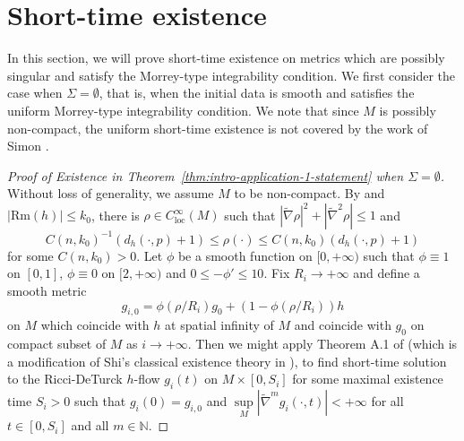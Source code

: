 \documentclass[12pt]{amsart}
\theoremstyle{plain}
\theoremstyle{plain}
\theoremstyle{definition}
\theoremstyle{remark}
\numberwithin{equation}{subsection}
\newcommand{\hdel}{\tilde{\nabla}}
\begin{document}
\section{Short-time existence}\label{sec:proof-of-main-theorem}
In this section, we will prove short-time existence on metrics which are possibly singular and satisfy the Morrey-type integrability condition. We first consider the case when $\Sigma=\emptyset$, that is, when the initial data is smooth and satisfies the uniform Morrey-type integrability condition. We note that since $M$ is possibly non-compact, the uniform short-time existence is not covered by the work of Simon \cite{simon_deformation_2002}.
\begin{proof}[Proof of Existence in Theorem~\ref{thm:intro-application-1-statement} when $\Sigma=\emptyset$]

Without loss of generality, we assume $M$ to be non-compact. By \cite{tam_exhaustion_2010} and $|\text{Rm}(h)|\leq k_0$, there is $\rho \in C^\infty_\text{loc}(M)$ such that $|\hdel \rho|^2 + |\hdel^2 \rho| \leq 1$ and
    \begin{equation*}
        C(n,k_0)^{-1}(d_h(\cdot, p)+1)\leq \rho(\cdot) \leq  C(n,k_0)(d_h(\cdot,p) + 1)
    \end{equation*}
    for some $ C(n,k_0)>0$. Let $\phi$ be a smooth function on $[0,+\infty)$ such that $\phi \equiv 1$ on $[0,1]$, $\phi \equiv 0$ on $[2,+\infty)$ and $0\leq-\phi'\leq 10$. Fix $R_i\to+\infty$ and define a smooth metric 
    $$g_{i,0}=\phi(\rho/R_i)g_0+(1-\phi(\rho/R_i)) h$$
on $M$ which coincide with $h$ at spatial infinity of $M$ and coincide with $g_0$ on compact subset of $M$ as $i\to+\infty$. Then we might apply Theorem A.1 of \cite{lamm_ricci_2021} (which is a modification of Shi's classical existence theory in \cite{shi_deforming_1989}), to find  short-time solution to the Ricci-DeTurck $h$-flow $g_i(t)$ on $M \times [0,S_i]$ for some maximal existence time $S_i > 0$ such that $g_i(0) = g_{i,0}$ and $\sup\limits_M |\hdel^m g_i(\cdot, t)|<+\infty$ for all $t \in [0, S_i]$ and all $m\in \mathbb{N}$. %


\end{proof}
\end{document}
